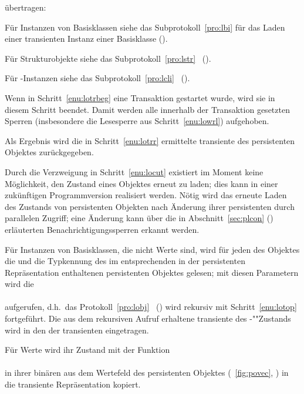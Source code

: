 \begin{infol}
\begin{block}
\representation{} \"{u}bertragen:
%
\begin{block}%
%
\item F\"{u}r Instanzen von Basisklassen siehe das
Subprotokoll~\ref{pro:lbi} f\"{u}r das Laden einer transienten
Instanz einer Basisklasse (\citepage{\pageref{pro:lbi}}).
%
\item F\"{u}r Strukturobjekte siehe das Subprotokoll~\ref{pro:lstr}
\ (\citepage{\pageref{pro:lstr}}).
%
\item F\"{u}r \clos-Instanzen siehe das Subprotokoll~\ref{pro:lcli}
\ (\citepage{\pageref{pro:lcli}}).
%
\end{block}%
%
\item\label{enu:lotrend} Wenn in Schritt~\ref{enu:lotrbeg} eine
Transaktion gestartet wurde, wird sie in diesem Schritt beendet. Damit
werden alle innerhalb der Transaktion gesetzten Sperren
(insbesondere die Lesesperre aus Schritt~\ref{enu:lowrl})
aufgehoben.
%
\item\label{enu:loend} Als Ergebnis wird die in
Schritt~\ref{enu:lotrr} ermittelte transiente \representation{} des
persistenten Objektes zur\"{u}ckgegeben.
%
\end{block}%
\end{infol}%
%
Durch die Verzweigung in Schritt~\ref{enu:locut} existiert im Moment
keine M\"{o}glichkeit, den Zustand eines Objektes erneut zu laden; dies
kann in einer zuk\"{u}nftigen Programmversion realisiert werden. N\"{o}tig
wird das erneute Laden des Zustands von persistenten Objekten
nach \"{A}nderung ihrer persistenten \representation{} durch parallelen
Zugriff; eine \"{A}nderung kann \"{u}ber die in Abschnitt~\ref{sec:plcon}
(\citepage{\pageref{sec:plcon}}) erl\"{a}uterten
Benachrichtigungssperren erkannt werden.
%
\begin{infol}%
%
\label{pro:lbi}
%
\item F\"{u}r Instanzen von Basisklassen, die nicht Werte sind,
wird f\"{u}r jeden \Slt\/ des Objektes die \sobjid\/ und die Typkennung des
im entsprechenden \Slt\/ in der persistenten Re\-pr\"{a}\-sen\-ta\-tion
enthaltenen persistenten Objektes gelesen; mit diesen Parametern wird
die \gfn\\
\\
aufgerufen, d.h.\ das Protokoll~\ref{pro:lobj}
\ (\citepage{\pageref{pro:lobj}}) wird rekursiv 
mit Schritt~\ref{enu:lotop} fortgef\"{u}hrt. Die aus dem rekursiven
Aufruf erhaltene transiente \representation{} des \Slt\/-""Zu\-stands
wird in den \Slt\/ der transienten \representation{} eingetragen.
%
\item F\"{u}r Werte wird ihr Zustand mit der Funktion\\
\\
in ihrer bin\"{a}ren \representation{} aus dem Wertefeld des
persistenten Objektes (\figurename~\ref{fig:povec},
\citepage{\pageref{fig:povec}}) in die transiente Repr\"{a}sentation
kopiert.
%
\end{infol}
